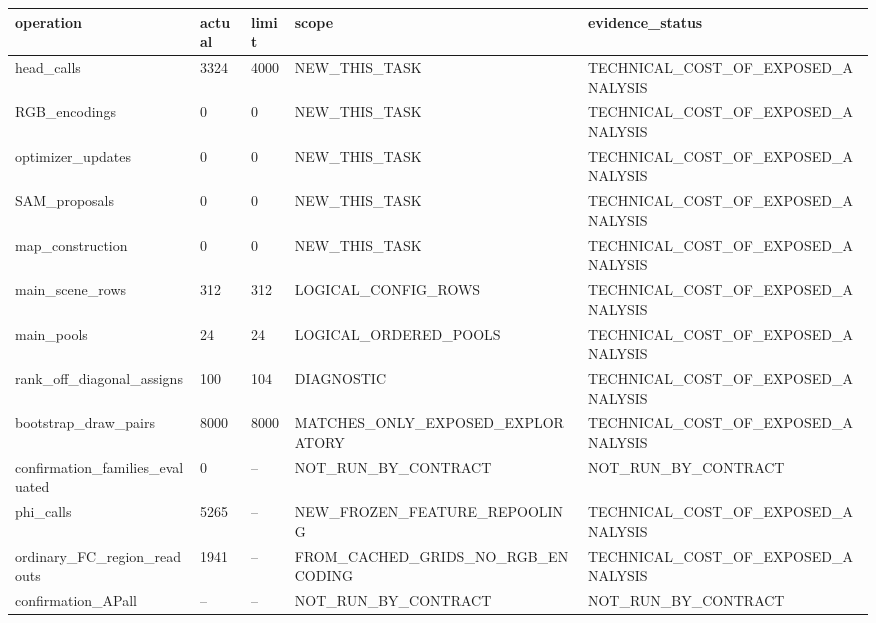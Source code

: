 \begin{tabular}{lllll}
\toprule
operation & actual & limit & scope & evidence\_status \\
\midrule
head\_calls & 3324 & 4000 & NEW\_THIS\_TASK & TECHNICAL\_COST\_OF\_EXPOSED\_ANALYSIS \\
RGB\_encodings & 0 & 0 & NEW\_THIS\_TASK & TECHNICAL\_COST\_OF\_EXPOSED\_ANALYSIS \\
optimizer\_updates & 0 & 0 & NEW\_THIS\_TASK & TECHNICAL\_COST\_OF\_EXPOSED\_ANALYSIS \\
SAM\_proposals & 0 & 0 & NEW\_THIS\_TASK & TECHNICAL\_COST\_OF\_EXPOSED\_ANALYSIS \\
map\_construction & 0 & 0 & NEW\_THIS\_TASK & TECHNICAL\_COST\_OF\_EXPOSED\_ANALYSIS \\
main\_scene\_rows & 312 & 312 & LOGICAL\_CONFIG\_ROWS & TECHNICAL\_COST\_OF\_EXPOSED\_ANALYSIS \\
main\_pools & 24 & 24 & LOGICAL\_ORDERED\_POOLS & TECHNICAL\_COST\_OF\_EXPOSED\_ANALYSIS \\
rank\_off\_diagonal\_assigns & 100 & 104 & DIAGNOSTIC & TECHNICAL\_COST\_OF\_EXPOSED\_ANALYSIS \\
bootstrap\_draw\_pairs & 8000 & 8000 & MATCHES\_ONLY\_EXPOSED\_EXPLORATORY & TECHNICAL\_COST\_OF\_EXPOSED\_ANALYSIS \\
confirmation\_families\_evaluated & 0 & -- & NOT\_RUN\_BY\_CONTRACT & NOT\_RUN\_BY\_CONTRACT \\
phi\_calls & 5265 & -- & NEW\_FROZEN\_FEATURE\_REPOOLING & TECHNICAL\_COST\_OF\_EXPOSED\_ANALYSIS \\
ordinary\_FC\_region\_readouts & 1941 & -- & FROM\_CACHED\_GRIDS\_NO\_RGB\_ENCODING & TECHNICAL\_COST\_OF\_EXPOSED\_ANALYSIS \\
confirmation\_APall & -- & -- & NOT\_RUN\_BY\_CONTRACT & NOT\_RUN\_BY\_CONTRACT \\
\bottomrule
\end{tabular}
